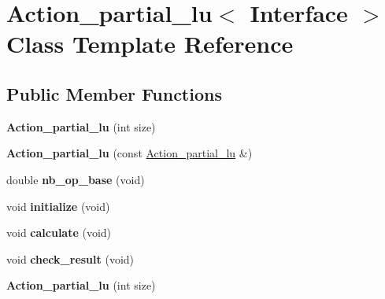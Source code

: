 \hypertarget{class_action__partial__lu}{}\section{Action\+\_\+partial\+\_\+lu$<$ Interface $>$ Class Template Reference}
\label{class_action__partial__lu}
\subsection*{Public Member Functions}
\begin{DoxyCompactItemize}
\item 
\mbox{\label{class_action__partial__lu_a55c057946d440677b2010dc99c47dccc}} 
{\bfseries Action\+\_\+partial\+\_\+lu} (int size)
\item 
\mbox{\label{class_action__partial__lu_a5af4af0f6781a216da38efc8baba61b0}} 
{\bfseries Action\+\_\+partial\+\_\+lu} (const \hyperlink{class_action__partial__lu}{Action\+\_\+partial\+\_\+lu} \&)
\item 
\mbox{\label{class_action__partial__lu_a130df0e035223b26ded297fdcba3b9b9}} 
double {\bfseries nb\+\_\+op\+\_\+base} (void)
\item 
\mbox{\label{class_action__partial__lu_a47eac466d6b3a7b27bdd7854dc006b1a}} 
void {\bfseries initialize} (void)
\item 
\mbox{\label{class_action__partial__lu_a81d0d52e0445a2e760ee9d85d167f753}} 
void {\bfseries calculate} (void)
\item 
\mbox{\label{class_action__partial__lu_aac1f68adffffe692f6b9cf0277037396}} 
void {\bfseries check\+\_\+result} (void)
\item 
\mbox{\label{class_action__partial__lu_a55c057946d440677b2010dc99c47dccc}} 
{\bfseries Action\+\_\+partial\+\_\+lu} (int size)
\item 
\mbox{\label{class_action__partial__lu_a5af4af0f6781a216da38efc8baba61b0}} 

\end{DoxyCompactItemize}
